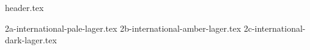 \clearpage
{}
\divisorLine
{header.tex}
\begin{multicols}{2}
{2a-international-pale-lager.tex}
{2b-international-amber-lager.tex}
{2c-international-dark-lager.tex}
\end{multicols}
